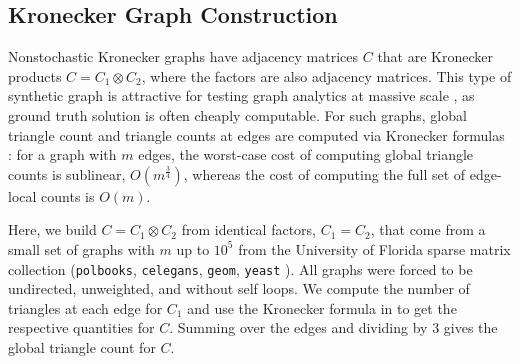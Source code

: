 \documentclass{vldb}
\begin{document}
\begin{appendix}

\section{Kronecker Graph Construction}
 \label{apdx:kronecker}

Nonstochastic Kronecker graphs \cite{weichsel1962kronecker} have adjacency matrices $C$ that are Kronecker products $C = C_1 \otimes C_2$, where the factors are also adjacency matrices.
This type of synthetic graph is attractive for testing graph analytics at massive scale \cite{leskovec2010kronecker, kepner2018design}, as ground truth solution is often cheaply computable.
For such graphs, global triangle count and triangle counts at edges are computed via Kronecker formulas \cite{sanders2018large}: for a graph with $m$ edges, the worst-case cost of computing global triangle counts is sublinear, $O \left ( m^{\frac{3}{4}} \right )$, whereas the cost of computing the full set of edge-local counts is $O \left ( m \right )$.

Here, we build $C = C_1 \otimes C_2$ from identical factors, $C_1=C_2$, that come from a small set of  graphs with $m$ up to $10^5$ from the University of Florida sparse matrix collection ({\tt polbooks}, {\tt celegans}, {\tt geom}, {\tt yeast} \cite{davis2011university}). 
All graphs were forced to be undirected, unweighted, and without self loops.  
We compute the number of triangles at each edge for $C_1$ and use the Kronecker formula in \cite{sanders2018large} to get the respective quantities for $C$.
Summing over the edges and dividing by 3 gives the global triangle count for $C$.


\end{appendix}
\end{document}
